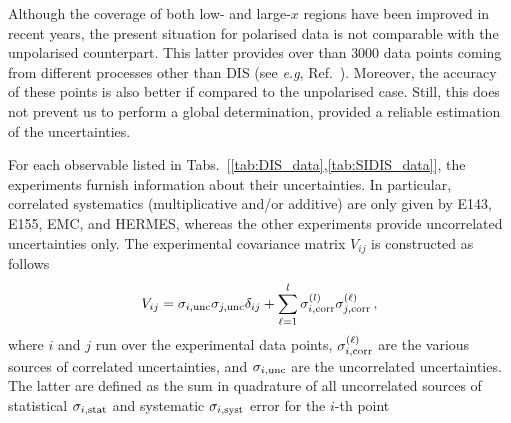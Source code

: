 Although the coverage of both low- and large-$x$ regions have been improved in recent years, the present situation for polarised data is not comparable with the unpolarised counterpart. This latter provides over than $3000$ data points coming from different processes other than DIS (see \textit{e.g}, Ref.~\cite{Kassabov:2022pps}). Moreover, the accuracy of these points is also better if compared to the unpolarised case. Still, this does not prevent us to perform a global determination, provided a reliable estimation of the uncertainties.%

For each observable listed in Tabs.~[\ref{tab:DIS_data},\ref{tab:SIDIS_data}], the experiments furnish information about their uncertainties. In particular, correlated systematics (multiplicative and/or additive) are only given by E143, E155, EMC, and HERMES, whereas the other experiments provide uncorrelated uncertainties only. The experimental covariance matrix $V_{ij}$ is constructed as follows
\begin{equation}
  V_{ij} =  \sigma_{i,\textrm{unc}} \sigma_{j,\textrm{unc}} \delta_{ij} + \sum_{\ell=1}^{l} \sigma_{i,\textrm{corr}}^{(l)} \sigma_{j,\textrm{corr}}^{(\ell)} \,,
\end{equation}
where $i$ and $j$ run over the experimental data points, $\sigma_{i,\textrm{corr}}^{(\ell)}$ are the various sources of correlated uncertainties, and $\sigma_{i,\textrm{unc}}$ are the uncorrelated uncertainties. The latter are defined as the sum in quadrature of all uncorrelated sources of statistical $\sigma_{i,\textrm{stat}}$ and systematic $\sigma_{i,\textrm{syst}}$ error for the $i$-th point
